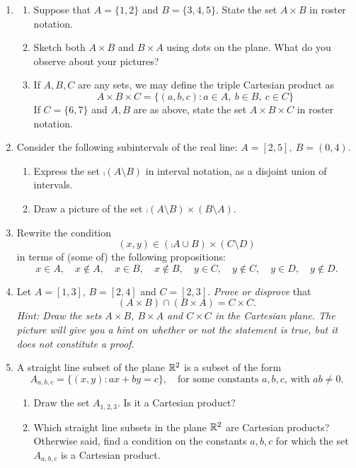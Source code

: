 \begin{exercises}{}{}

\begin{enumerate}
  \item\begin{enumerate}
    \item Suppose that $A=\{1,2\}$ and $B=\{3,4,5\}$. State the set $A\times B$ in roster notation.
    \item Sketch both $A\times B$ and $B\times A$ using dots on the plane. What do you observe about your pictures?
    \item If $A,B,C$ are any sets, we may define the triple Cartesian product as
    \[A\times B\times C=\big\{(a,b,c):a\in A,\ b\in B,\ c\in C\big\}\]
    If $C=\{6,7\}$ and $A,B$ are as above, state the set $A\times B\times C$ in roster notation.
  \end{enumerate}
  
  \item Consider the following subintervals of the real line: $A=[2,5],\ B=(0,4)$.
  \begin{enumerate}
    \item Express the set $\comp{(A\setminus B)}$ in interval notation, as a disjoint union of intervals.
    \item Draw a picture of the set $\comp{(A\setminus B)}\times (B\setminus A)$.
  \end{enumerate}

	\item Rewrite the condition
	\[(x,y)\in (\comp{A}\cup B)\times (C\setminus D)\]
	in terms of (some of) the following propositions:
	\[x\in A,\quad x\not\in A,\quad x\in B,\quad x\not\in B,\quad y\in C,\quad y\not\in C,\quad y\in D,\quad y\not\in D.\]

	\item Let $A=[1,3]$, $B=[2,4]$ and $C=[2,3]$. \emph{Prove or disprove} that
	\[(A\times B)\cap (B\times A)=C\times C.\]
	\emph{Hint: Draw the sets $A\times B$, $B\times A$ and $C\times C$ in the Cartesian plane. The picture will give you a hint on whether or not the statement is true, but it does not constitute a proof.}
	
	\item A straight line subset of the plane $\mathbb{R}^2$ is a subset of the form
	  \[A_{a,b,c}=\{(x,y):ax+by=c\},\quad\text{for some constants $a,b,c$, with $ab\neq 0$.}\]
	  \begin{enumerate}
	  \item Draw the set $A_{1,2,3}$. Is it a Cartesian product?
	 	\item Which straight line subsets in the plane $\mathbb{R}^2$ are Cartesian products? Otherwise said, find a condition on the constants $a,b,c$ for which the set $A_{a,b,c}$ is a Cartesian product.
		\end{enumerate}
	

\end{enumerate}
\end{exercises}
